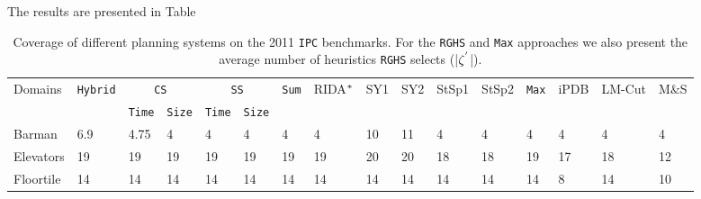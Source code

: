 The results are presented in Table




\begin{table}[htb]
\footnotesize\setlength{\tabcolsep}{1.8pt}
\centering
\caption{Coverage of different planning systems on the 2011 \texttt{IPC} benchmarks. For the \texttt{RGHS} and \texttt{Max} approaches we also present the average number of heuristics \texttt{RGHS} selects (|$\zeta\sp{'}$|).}
\begin{tabular}{llllllllllllllll}
\hline
\multirow{2}{*}{Domains} & \multirow{2}{*}{\texttt{Hybrid}} & \multicolumn{2}{c}{\texttt{CS}} & \multicolumn{2}{c}{\texttt{SS}} & \multirow{2}{*}{\texttt{Sum}} & \multirow{2}{*}{RIDA$\sp{*}$} & \multirow{2}{*}{SY1} & \multirow{2}{*}{SY2} & \multirow{2}{*}{StSp1} & \multirow{2}{*}{StSp2} & \multirow{2}{*}{\texttt{Max}} & \multirow{2}{*}{iPDB} & \multirow{2}{*}{LM-Cut} & \multirow{2}{*}{M$\&$S} \\ \cline{3-6}
                         &                                    & \texttt{Time} & \texttt{Size} & \texttt{Time} & \texttt{Size} &                                 &                       &                      &                      &                        &                        &                                 &                       &                         &                         \\ \hline
Barman                   & 6.9                                & 4.75            & 4               & 4               & 4               & 4                               & 4                     & 10                   & 11                   & 4                      & 4                      & 4                               & 4                     & 4                       & 4                       \\
Elevators                & 19                                 & 19              & 19              & 19              & 19              & 19                              & 19                    & 20                   & 20                   & 18                     & 18                     & 19                              & 17                    & 18                      & 12                      \\
Floortile                & 14                                 & 14              & 14              & 14              & 14              & 14                              & 14                    & 14                   & 14                   & 14                     & 14                     & 14                              & 8                     & 14                      & 10                      \\

\end{tabular}
\end{table}
